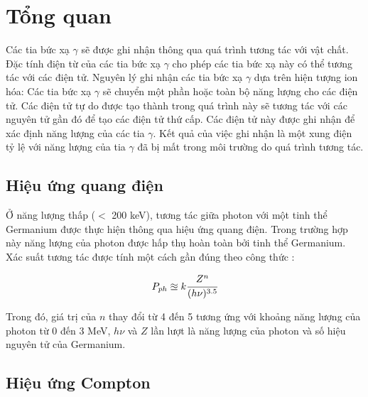 \chapter{Tổng quan}
\label{ch:tongquan}

Các tia bức xạ $\gamma$ sẽ được ghi nhận thông qua quá trình tương tác với vật chất. Đặc tính điện từ của các tia bức xạ $\gamma$ cho phép các tia bức xạ này có thể tương tác với các điện tử. Nguyên lý ghi nhận các tia bức xạ $\gamma$ dựa trên hiện tượng ion hóa: Các tia bức xạ $\gamma$ sẽ chuyển một phần hoặc toàn bộ năng lượng cho các điện tử. Các điện tử tự do được tạo thành trong quá trình này sẽ tương tác với các nguyên tử gần đó để tạo các điện tử thứ cấp. Các điện tử này được ghi nhận để xác định năng lượng của các tia $\gamma$. Kết quả của việc ghi nhận là một xung điện tỷ lệ với năng lượng của tia $\gamma$ đã  bị mất trong môi trường do quá trình tương tác.%

\section{Hiệu ứng quang điện}%
Ở năng lượng thấp ($<$ 200 keV), tương tác giữa photon với một tinh thể Germanium được thực hiện thông qua hiệu ứng quang điện. Trong trường hợp này năng lượng của photon được hấp thụ hoàn toàn bởi tinh thể Germanium. Xác suất tương tác được tính một cách gần đúng theo công thức \cite{bib_Knoll, bib_ghinhanbucxa, bib_vatlyhatnhanungdung}:%

\begin{equation}%
	P_{ph}\approxeq k\cfrac{Z^{n}}{(h\nu)^{3.5}}
\label{equ:huquangdien}%
\end{equation}%

Trong đó, giá trị của $n$ thay đổi từ 4 đến 5 tương ứng với khoảng năng lượng của photon từ 0 đến 3 MeV, $h\nu$  và $Z$ lần lượt là năng lượng của photon và số hiệu nguyên tử của Germanium.%

\section{Hiệu ứng Compton}


